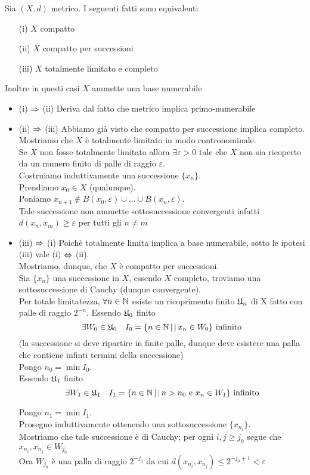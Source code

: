 \begin{thm}
 Sia $(X,d)$ metrico. I seguenti fatti sono equivalenti
 \begin{itemize}
  \item[(i)] $X$ compatto
  \item[(ii)] $X$ compatto per successioni
  \item[(iii)] $X$ totalmente limitato e completo
 \end{itemize}
 Inoltre in questi casi $X$ ammette una base numerabile
 \proof \bbianco
\begin{itemize}
 \item (i) $\Rightarrow$ (ii) Deriva dal fatto che metrico implica primo-numerabile
 \item (ii) $\Rightarrow$ (iii) Abbiamo gi\`a visto che compatto per successione implica completo.\\
 Mostriamo che $X$ \`e totalmente limitato in modo contronominale.\\
 Se $X$ non fosse totalmente limitato allora $\exists \varepsilon>0$ tale che $X$ non sia ricoperto da un numero finito di palle di raggio $\varepsilon$.\\
 Costruiamo induttivamente una successione $\{x_n\}$.\\
 Prendiamo $x_0\in X$ (qualunque).\\
 Poniamo $x_{n+1}\not\in B(x_0,\varepsilon) \cup \dots \cup B(x_n, \varepsilon)$.\\
 Tale successione non ammette sottosuccessione convergenti infatti $d(x_n, x_m) \geq \varepsilon $ per tutti gli $n \neq m $
\item (iii) $\Rightarrow$ (i) Poich\`e totalmente limita implica a base numerabile, sotto le ipotesi (iii) vale (i) $\Leftrightarrow$ (ii).\\
Mostriamo, dunque, che $X$ \`e compatto per successioni.\\
Sia $\{ x_n\}$ una successione in $X$, essendo $X$ completo, troviamo una sottosuccessione di Cauchy (dunque convergente).\\
Per totale limitatezza, $\forall n \in \mathbb{N}$ esiste un ricoprimento finito $\mathfrak{U}_n$ di X fatto con palle di raggio $2^{-n}$.
Essendo $\mathfrak{U}_0$ finito
$$ \exists W_0 \in \mathfrak{U}_0 \quad I_0=\{ n \in \mathbb{N} \, \vert \, \vert \, x_n \in W_0 \} \text{ infinito}$$
(la successione si deve ripartire in finite palle, dunque deve esistere una palla che contiene infinti termini della successione)\\
Pongo $n_0=\min I_0$.\\
Essendo $\mathfrak{U}_1$ finito
$$ \exists W_1 \in \mathfrak{U}_1 \quad I_1=\{ n \in \mathbb{N} \, \vert \, \vert \, n> n_0 \text{ e } x_n \in W_1 \} \text{ infinito}$$

Pongo $n_1=\min I_1$.\\
Proseguo induttivamente ottenendo una sottosuccessione $\{x_{n_i}\}$.\\
Mostriamo che tale successione \`e di Cauchy; per ogni $i,j \geq j_0$ segue che $x_{n_i}, x_{n_j} \in W_{j_0}$\\
Ora $W_{j_0}$ \`e una palla di raggio $2^{-j_0}$ da cui $d(x_{n_i}, x_{n_j}) \leq 2^{-j_0+1} < \varepsilon$
\end{itemize}
\endproof
\end{thm}


